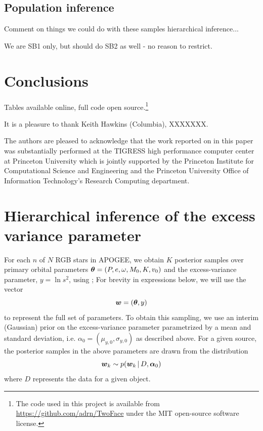 \documentclass[modern, letterpaper]{aastex62}
\newcommand{\apogee}{\project{\acronym{APOGEE}}}
\newcommand{\sdssiv}{\project{\acronym{SDSS-IV}}}
\newcommand{\thejoker}{\project{The~Joker}}
\begin{document}
\subsection{Population inference}

Comment on things we could do with these samples hierarchical inference...

We are SB1 only, but should do SB2 as well - no reason to restrict.

\section{Conclusions}

Tables available online, full code open source.\footnote{The code used in this
project is available from \url{https://github.com/adrn/TwoFace} under the MIT
open-source software license.}

\acknowledgements

It is a pleasure to thank Keith Hawkins (Columbia), XXXXXXX.

The authors are pleased to acknowledge that the work reported on in this
paper was substantially performed at the TIGRESS high performance computer
center at Princeton University which is jointly supported by the Princeton
Institute for Computational Science and Engineering and the Princeton
University Office of Information Technology's Research Computing department.


\facility{\sdssiv, \apogee}




\appendix
\section{Hierarchical inference of the excess variance parameter}
\label{sec:hierarch}

For each $n$ of $N$ RGB stars in APOGEE, we obtain $K$ posterior samples over
primary orbital parameters $\boldsymbol{\theta} = (P, e, \omega, M_0, K, v_0)$ and the
excess-variance parameter, $y = \ln s^2$, using \thejoker; For brevity in
expressions below, we will use the vector
\begin{equation}
    \bs{w} = (\bs{\theta}, y)
\end{equation}
to represent the full set of parameters.
To obtain this sampling, we use an interim (Gaussian) prior on the
excess-variance parameter parametrized by a mean and standard deviation, i.e.
$\alpha_0 = (\mu_{y,0}, \sigma_{y,0})$ as described above.
For a given source, the posterior samples in the above parameters are drawn from
the distribution
\begin{equation}
    \bs{w}_k \sim p(\bs{w}_k \given D, \bs{\alpha}_0)
\end{equation}
where $D$ represents the data for a given object.
\end{document}
